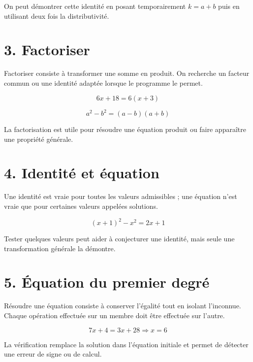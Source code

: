 \begin{exemple}
On peut démontrer cette identité en posant temporairement $k=a+b$ puis en utilisant deux fois la distributivité.
\end{exemple}


\section{3. Factoriser}
Factoriser consiste à transformer une somme en produit. On recherche un facteur commun ou une identité adaptée lorsque le programme le permet.

\[
6x+18=6(x+3)
\]

\[
a^2-b^2=(a-b)(a+b)
\]

\begin{exemple}
La factorisation est utile pour résoudre une équation produit ou faire apparaître une propriété générale.
\end{exemple}

\section{4. Identité et équation}
Une identité est vraie pour toutes les valeurs admissibles ; une équation n’est vraie que pour certaines valeurs appelées solutions.

\[
(x+1)^2-x^2=2x+1
\]

\begin{exemple}
Tester quelques valeurs peut aider à conjecturer une identité, mais seule une transformation générale la démontre.
\end{exemple}

\section{5. Équation du premier degré}
Résoudre une équation consiste à conserver l’égalité tout en isolant l’inconnue. Chaque opération effectuée sur un membre doit être effectuée sur l’autre.

\[
7x+4=3x+28\Rightarrow x=6
\]

\begin{exemple}
La vérification remplace la solution dans l’équation initiale et permet de détecter une erreur de signe ou de calcul.
\end{exemple}


